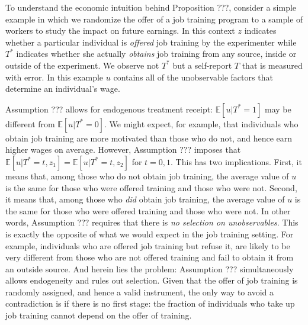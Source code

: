 To understand the economic intuition behind Proposition ???, consider a simple example in which we randomize the offer of a job training program to a sample of workers to study the impact on future earnings.
In this context $z$ indicates whether a particular individual is \emph{offered} job training by the experimenter while $T^*$ indicates whether she actually \emph{obtains} job training from any source, inside or outside of the experiment.
We observe not $T^*$ but a self-report $T$ that is measured with error.
In this example $u$ contains all of the unobservable factors that determine an individual's wage.

Assumption ??? allows for endogenous treatment receipt: $\mathbb{E}[u|T^*=1]$ may be different from $\mathbb{E}[u|T^*=0]$.
We might expect, for example, that individuals who obtain job training are more motivated than those who do not, and hence earn higher wages on average. 
However, Assumption ??? imposes that $\mathbb{E}\left[u|T^*=t,z_1 \right]=\mathbb{E}\left[ u|T^*=t,z_2 \right]$ for $t=0,1$.
This has two implications.
First, it means that, among those who do not obtain job training, the average value of $u$ is the same for those who were offered training and those who were not.
Second, it means that, among those who \emph{did} obtain job training, the average value of $u$ is the same for those who were offered training and those who were not.
In other words, Assumption ??? requires that there is \emph{no selection on unobservables}.
This is exactly the opposite of what we would expect in the job training setting.
For example, individuals who are offered job training but refuse it, are likely to be very different from those who are not offered training and fail to obtain it from an outside source. 
And herein lies the problem: Assumption ??? simultaneously allows endogeneity and rules out selection.
Given that the offer of job training is randomly assigned, and hence a valid instrument, the only way to avoid a contradiction is if there is no first stage: the fraction of individuals who take up job training cannot depend on the offer of training.

